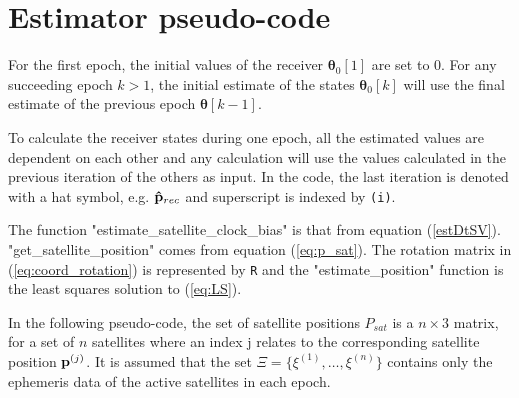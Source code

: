 \section{Estimator pseudo-code}
For the first epoch, the initial values of the receiver ${\boldsymbol \theta}_0[1]$ are set to 0. For any succeeding epoch $k>1$, the initial estimate of the states ${\boldsymbol \theta}_0[k]$ will use the final estimate of the previous epoch ${\boldsymbol \theta}[k-1]$. 
\par 
To calculate the receiver states during one epoch, all the estimated values are dependent on each other and any calculation will use the values calculated in the previous iteration of the others as input. In the code, the last iteration is denoted with a hat symbol, e.g. ${\bf \hat{p}}_{rec}$ and superscript is indexed by \texttt{(i)}. 
\par
The function "estimate\_satellite\_clock\_bias" is that from equation (\ref{estDtSV}). "get\_satellite\_position" comes from equation (\ref{eq:p_sat}). The rotation matrix in (\ref{eq:coord_rotation}) is represented by \texttt{R} and the "estimate\_position" function is the least squares solution to (\ref{eq:LS}). 
\par
In the following pseudo-code, the set of satellite positions $P_{sat}$ is a $n\times 3$ matrix, for a set of $n$ satellites where an index j relates to the corresponding satellite position ${\bf p}^{(j)}$. It is assumed that the set $\Xi=\{\xi^{(1)},\dots, \xi^{(n)}\}$ contains only the ephemeris data of the active satellites in each epoch.
\begin{algorithmic}
\ENDFOR
{}
\ENDFOR
{}
\ENDFOR
{}
\ENDFOR
{}
\ENDWHILE
\end{algorithmic}
